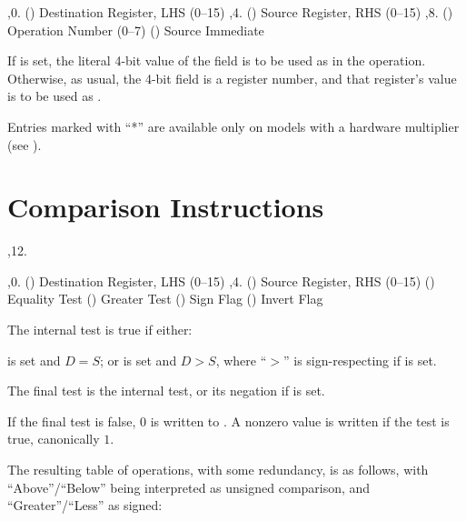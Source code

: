 \li \ins{},0. () Destination Register, LHS (0--15)
\li \ins{},4. () Source Register, RHS (0--15)
\li \ins{},8. () Operation Number (0--7)
\li \ins{} () Source Immediate

If  is set, the literal 4-bit value of the  field is to be used
as  in the operation. Otherwise, as usual, the 4-bit field is a register
number, and that register's value is to be used as .

\bigskip
{
	\offinterlineskip
}
\bigskip

Entries marked with ``*'' are available only on models with a hardware
multiplier (see ).

\section{Comparison Instructions}

\noindent\ins{},12. 

\li \ins{},0. () Destination Register, LHS (0--15)
\li \ins{},4. () Source Register, RHS (0--15)
\li \ins{} () Equality Test
\li \ins{} () Greater Test
\li \ins{} () Sign Flag
\li \ins{} () Invert Flag

The internal test is true if either:

\li {} is set and $D = S$; or
\li {} is set and $D > S$, where ``$>$'' is sign-respecting if 
is set.

The final test is the internal test, or its negation if  is set.

If the final test is false, $0$ is written to . A nonzero value is
written if the test is true, canonically $1$.

The resulting table of operations, with some redundancy, is as follows, with
``Above''/``Below'' being interpreted as unsigned comparison, and
``Greater''/``Less'' as signed:

